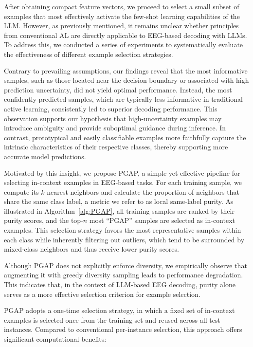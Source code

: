 \documentclass[journal,twocolumn]{IEEEtran}
\begin{document}
After obtaining compact feature vectors, we proceed to select a small subset of examples that most effectively activate the few-shot learning capabilities of the LLM. However, as previously mentioned, it remains unclear whether principles from conventional AL are directly applicable to EEG-based decoding with LLMs. To address this, we conducted a series of experiments to systematically evaluate the effectiveness of different example selection strategies.

Contrary to prevailing assumptions, our findings reveal that the most informative samples, such as those located near the decision boundary or associated with high prediction uncertainty, did not yield optimal performance. Instead, the most confidently predicted samples, which are typically less informative in traditional active learning, consistently led to superior decoding performance. This observation supports our hypothesis that high-uncertainty examples may introduce ambiguity and provide suboptimal guidance during inference. In contrast, prototypical and easily classifiable examples more faithfully capture the intrinsic characteristics of their respective classes, thereby supporting more accurate model predictions.

Motivated by this insight, we propose PGAP, a simple yet effective pipeline for selecting in-context examples in EEG-based tasks. For each training sample, we compute its $k$ nearest neighbors and calculate the proportion of neighbors that share the same class label, a metric we refer to as local same-label purity. As illustrated in Algorithm~\ref{alg:PGAP}, all training samples are ranked by their purity scores, and the top-$n$ most “PGAP” samples are selected as in-context examples. This selection strategy favors the most representative samples within each class while inherently filtering out outliers, which tend to be surrounded by mixed-class neighbors and thus receive lower purity scores.

Although PGAP does not explicitly enforce diversity, we empirically observe that augmenting it with greedy diversity sampling leads to performance degradation. This indicates that, in the context of LLM-based EEG decoding, purity alone serves as a more effective selection criterion for example selection.

PGAP adopts a one-time selection strategy, in which a fixed set of in-context examples is selected once from the training set and reused across all test instances. Compared to conventional per-instance selection, this approach offers significant computational benefits:
\end{document}

